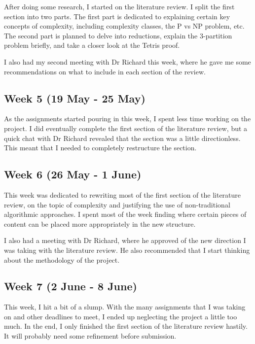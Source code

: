 \documentclass[a4paper, 12pt]{extreport}
\begin{document}
				After doing some research, I started on the literature review. I split the first section into two parts. The first part is dedicated to explaining certain key concepts of complexity, including complexity classes, the P vs NP problem, etc. The second part is planned to delve into reductions, explain the 3-partition problem briefly, and take a closer look at the Tetris proof.
				
				I also had my second meeting with Dr Richard this week, where he gave me some recommendations on what to include in each section of the review.
				
			\subsection{Week 5 (19 May - 25 May)}
			
				As the assignments started pouring in this week, I spent less time working on the project. I did eventually complete the first section of the literature review, but a quick chat with Dr Richard revealed that the section was a little directionless. This meant that I needed to completely restructure the section.
			
			\subsection{Week 6 (26 May - 1 June)}
			
				This week was dedicated to rewriting most of the first section of the literature review, on the topic of complexity and justifying the use of non-traditional algorithmic approaches. I spent most of the week finding where certain pieces of content can be placed more appropriately in the new structure.
				
				I also had a meeting with Dr Richard, where he approved of the new direction I was taking with the literature review. He also recommended that I start thinking about the methodology of the project.
			
			\subsection{Week 7 (2 June - 8 June)}
			
				This week, I hit a bit of a slump. With the many assignments that I was taking on and other deadlines to meet, I ended up neglecting the project a little too much. In the end, I only finished the first section of the literature review hastily. It will probably need some refinement before submission.
		
\end{document}
